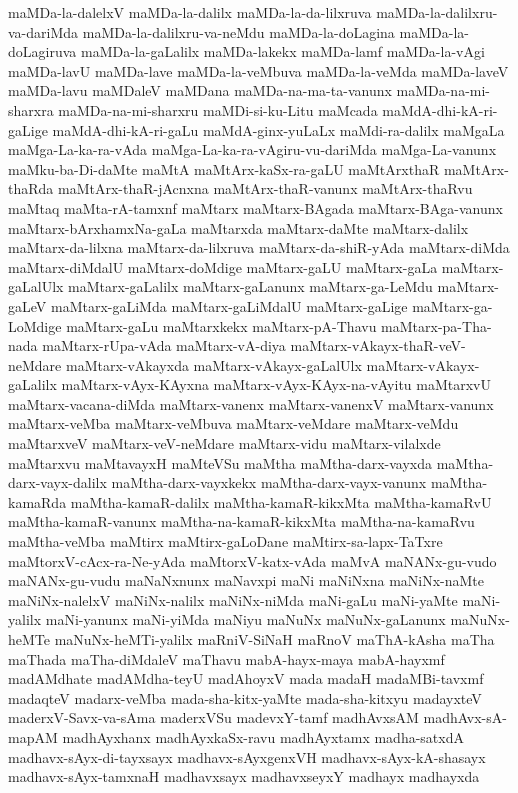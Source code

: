 {maMDa-la-dalelxV
maMDa-la-dalilx
maMDa-la-da-lilxruva
maMDa-la-dalilxru-va-dariMda
maMDa-la-dalilxru-va-neMdu
maMDa-la-doLagina
maMDa-la-doLagiruva
maMDa-la-gaLalilx
maMDa-lakekx
maMDa-lamf
maMDa-la-vAgi
maMDa-lavU
maMDa-lave
maMDa-la-veMbuva
maMDa-la-veMda
maMDa-laveV
maMDa-lavu
maMDaleV
maMDana
maMDa-na-ma-ta-vanunx
maMDa-na-mi-sharxra
maMDa-na-mi-sharxru
maMDi-si-ku-Litu
maMcada
maMdA-dhi-kA-ri-gaLige
maMdA-dhi-kA-ri-gaLu
maMdA-ginx-yuLaLx
maMdi-ra-dalilx
maMgaLa
maMga-La-ka-ra-vAda
maMga-La-ka-ra-vAgiru-vu-dariMda
maMga-La-vanunx
maMku-ba-Di-daMte
maMtA
maMtArx-kaSx-ra-gaLU
maMtArxthaR
maMtArx-thaRda
maMtArx-thaR-jAcnxna
maMtArx-thaR-vanunx
maMtArx-thaRvu
maMtaq
maMta-rA-tamxnf
maMtarx
maMtarx-BAgada
maMtarx-BAga-vanunx
maMtarx-bArxhamxNa-gaLa
maMtarxda
maMtarx-daMte
maMtarx-dalilx
maMtarx-da-lilxna
maMtarx-da-lilxruva
maMtarx-da-shiR-yAda
maMtarx-diMda
maMtarx-diMdalU
maMtarx-doMdige
maMtarx-gaLU
maMtarx-gaLa
maMtarx-gaLalUlx
maMtarx-gaLalilx
maMtarx-gaLanunx
maMtarx-ga-LeMdu
maMtarx-gaLeV
maMtarx-gaLiMda
maMtarx-gaLiMdalU
maMtarx-gaLige
maMtarx-ga-LoMdige
maMtarx-gaLu
maMtarxkekx
maMtarx-pA-Thavu
maMtarx-pa-Tha-nada
maMtarx-rUpa-vAda
maMtarx-vA-diya
maMtarx-vAkayx-thaR-veV-neMdare
maMtarx-vAkayxda
maMtarx-vAkayx-gaLalUlx
maMtarx-vAkayx-gaLalilx
maMtarx-vAyx-KAyxna
maMtarx-vAyx-KAyx-na-vAyitu
maMtarxvU
maMtarx-vacana-diMda
maMtarx-vanenx
maMtarx-vanenxV
maMtarx-vanunx
maMtarx-veMba
maMtarx-veMbuva
maMtarx-veMdare
maMtarx-veMdu
maMtarxveV
maMtarx-veV-neMdare
maMtarx-vidu
maMtarx-vilalxde
maMtarxvu
maMtavayxH
maMteVSu
maMtha
maMtha-darx-vayxda
maMtha-darx-vayx-dalilx
maMtha-darx-vayxkekx
maMtha-darx-vayx-vanunx
maMtha-kamaRda
maMtha-kamaR-dalilx
maMtha-kamaR-kikxMta
maMtha-kamaRvU
maMtha-kamaR-vanunx
maMtha-na-kamaR-kikxMta
maMtha-na-kamaRvu
maMtha-veMba
maMtirx
maMtirx-gaLoDane
maMtirx-sa-lapx-TaTxre
maMtorxV-cAcx-ra-Ne-yAda
maMtorxV-katx-vAda
maMvA
maNANx-gu-vudo
maNANx-gu-vudu
maNaNxnunx
maNavxpi
maNi
maNiNxna
maNiNx-naMte
maNiNx-nalelxV
maNiNx-nalilx
maNiNx-niMda
maNi-gaLu
maNi-yaMte
maNi-yalilx
maNi-yanunx
maNi-yiMda
maNiyu
maNuNx
maNuNx-gaLanunx
maNuNx-heMTe
maNuNx-heMTi-yalilx
maRniV-SiNaH
maRnoV
maThA-kAsha
maTha
maThada
maTha-diMdaleV
maThavu
mabA-hayx-maya
mabA-hayxmf
madAMdhate
madAMdha-teyU
madAhoyxV
mada
madaH
madaMBi-tavxmf
madaqteV
madarx-veMba
mada-sha-kitx-yaMte
mada-sha-kitxyu
madayxteV
maderxV-Savx-va-sAma
maderxVSu
madevxY-tamf
madhAvxsAM
madhAvx-sA-mapAM
madhAyxhanx
madhAyxkaSx-ravu
madhAyxtamx
madha-satxdA
madhavx-sAyx-di-tayxsayx
madhavx-sAyxgenxVH
madhavx-sAyx-kA-shasayx
madhavx-sAyx-tamxnaH
madhavxsayx
madhavxseyxY
madhayx
madhayxda
}
